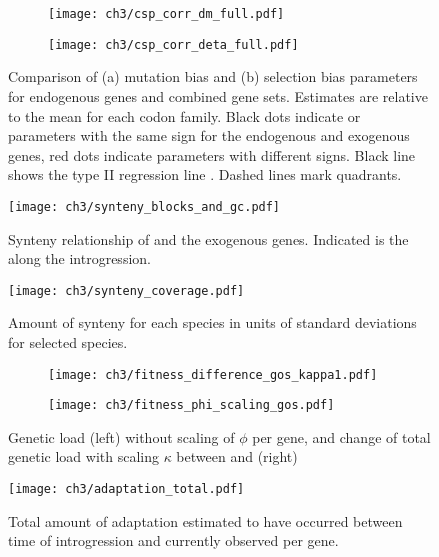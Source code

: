 \begin{figure}[h]
    \centering
    \begin{subfigure}
        \centering
        \texttt{[image: ch3/csp\_corr\_dm\_full.pdf]}
    \end{subfigure}
    \begin{subfigure}
        \centering
        \texttt{[image: ch3/csp\_corr\_deta\_full.pdf]}
    \end{subfigure}
    \caption{Comparison of (a) mutation bias \DM and (b) selection bias \DE parameters for endogenous genes and combined gene sets.
      Estimates are relative to the mean for each codon family.
      Black dots indicate \DM or \DE parameters with the same sign for the endogenous and exogenous genes, red dots indicate parameters with different signs.
      Black line shows the type II regression line \citep{SokalAndRohlf1981}.
      Dashed lines mark quadrants.}
    \label{fig:csp_end_comb}
\end{figure}
\null
\vfill
\clearpage


\null
\vfill
\begin{figure}[H]
     \centering
	\texttt{[image: ch3/synteny\_blocks\_and\_gc.pdf]}
	\caption{Synteny relationship of \gossypii and the exogenous genes. Indicated is the \GC along the introgression.}
	\label{fig:synt_rel}
\end{figure}
\null
\vfill
\clearpage
\null
\vfill
\begin{figure}[H]
     \centering
	\texttt{[image: ch3/synteny\_coverage.pdf]}
	\caption{Amount of synteny for each species in units of standard deviations for selected species.}
	\label{fig:synteny_species}
\end{figure}
\null
\vfill
\clearpage
\null
\vfill

\begin{figure}[h]
    \centering
    \begin{subfigure}
        \centering
        \texttt{[image: ch3/fitness\_difference\_gos\_kappa1.pdf]}
    \end{subfigure}
    \begin{subfigure}
        \centering
        \texttt{[image: ch3/fitness\_phi\_scaling\_gos.pdf]}
    \end{subfigure}
    \caption{Genetic load (left) without scaling of $\phi$ per gene, and change of total genetic load with scaling $\kappa$ between \gossypii and \kluyveri (right)}
    \label{fig:sne_scaling}
\end{figure}
\null
\vfill
\clearpage
\null
\vfill
\begin{figure}[H]
     \centering
	\texttt{[image: ch3/adaptation\_total.pdf]}
	\caption{Total amount of adaptation estimated to have occurred between time of introgression and currently observed per gene.}
	\label{fig:adapt_tot}
\end{figure}
\null
\vfill
\clearpage

